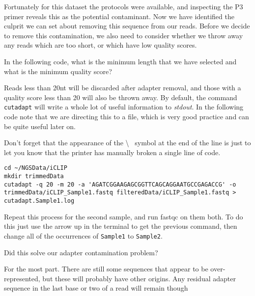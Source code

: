 Fortunately for this dataset the protocols were available, and inspecting the P3 primer reveals this as the potential contaminant.
Now we have identified the culprit we can set about removing this sequence from our reads.
Before we decide to remove this contamination, we also need to consider whether we throw away any reads which are too short, or which have low quality scores.

\begin{questions}
In the following code, what is the minimum length that we have selected and what is the minimum quality score?\\
\begin{answer}
Reads less than 20nt will be discarded after adapter removal, and those with a quality score less than 20 will also be thrown away.
By default, the command \texttt{cutadapt} will write a whole lot of useful information to \textit{stdout}.
In the following code note that we are directing this to a file, which is very good practice and can be quite useful later on.
\end{answer}
\end{questions}

\begin{warning}
Don't forget that the appearance of the \textbackslash ~ symbol at the end of the line is just to let you know that the printer has manually broken a single line of code.
\end{warning}

\begin{steps}
\begin{minipage}{\textwidth}
\begin{lstlisting}
cd ~/NGSData/iCLIP
mkdir trimmedData
cutadapt -q 20 -m 20 -a 'AGATCGGAAGAGCGGTTCAGCAGGAATGCCGAGACCG' -o trimmedData/iCLIP_Sample1.fastq filteredData/iCLIP_Sample1.fastq > cutadapt.Sample1.log
\end{lstlisting}
\end{minipage}
\end{steps}

\begin{steps}
Repeat this process for the second sample, and run fastqc on them both.
To do this just use the arrow up in the terminal to get the previous command, then change all of the occurrences of \texttt{Sample1} to \texttt{Sample2}.
\end{steps}

\begin{questions}
Did this solve our adapter contamination problem?\\
\begin{answer}
For the most part.
There are still some sequences that appear to be over-represented, but these will probably have other origins.
Any residual adapter sequence in the last base or two of a read will remain though
\end{answer}
\end{questions}


